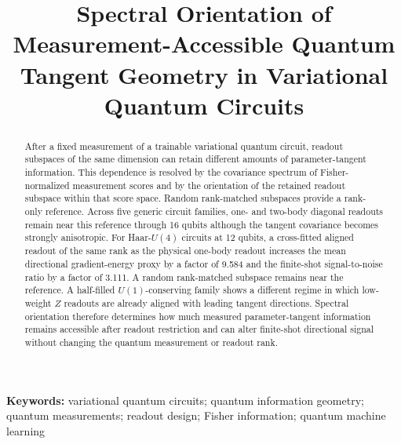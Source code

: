 
\title{Spectral Orientation of Measurement-Accessible Quantum Tangent Geometry in Variational Quantum Circuits}

\textbf{Keywords:} variational quantum circuits; quantum information geometry; quantum measurements; readout design; Fisher information; quantum machine learning

\begin{abstract}
After a fixed measurement of a trainable variational quantum circuit, readout subspaces of the same dimension can retain different amounts of parameter-tangent information. This dependence is resolved by the covariance spectrum of Fisher-normalized measurement scores and by the orientation of the retained readout subspace within that score space. Random rank-matched subspaces provide a rank-only reference. Across five generic circuit families, one- and two-body diagonal readouts remain near this reference through 16 qubits although the tangent covariance becomes strongly anisotropic. For Haar-$U(4)$ circuits at 12 qubits, a cross-fitted aligned readout of the same rank as the physical one-body readout increases the mean directional gradient-energy proxy by a factor of 9.584 and the finite-shot signal-to-noise ratio by a factor of 3.111. A random rank-matched subspace remains near the reference. A half-filled $U(1)$-conserving family shows a different regime in which low-weight $Z$ readouts are already aligned with leading tangent directions. Spectral orientation therefore determines how much measured parameter-tangent information remains accessible after readout restriction and can alter finite-shot directional signal without changing the quantum measurement or readout rank.
\end{abstract}
